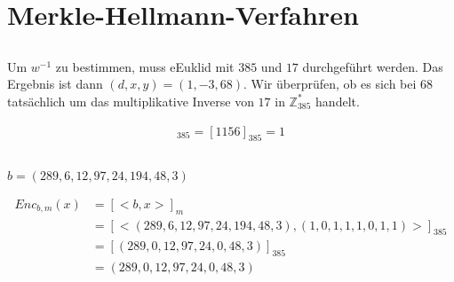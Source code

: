 \documentclass{../crypto}
\begin{document}
\section{Merkle-Hellmann-Verfahren}

%
%
%
%
%

\subsection{}
Um $w^{-1}$ zu bestimmen, muss eEuklid mit $385$ und $17$ durchgeführt werden. Das
Ergebnis ist dann $(d,x,y) = (1,-3,68)$. Wir überprüfen, ob es sich bei $68$
tatsächlich um das multiplikative Inverse von $17$ in $\mathbb{Z}_{385}^*$ handelt.

\begin{align*}
   [17 \cdot 68]_{385} = [1156]_{385} = 1
\end{align*}

\subsection{}

$b = (289, 6, 12, 97, 24, 194, 48, 3)$

\begin{align*}
   Enc_{b,m}(x)  & = [<b,x>]_m                                                            \\
                 & =  [<(289, 6, 12, 97, 24, 194, 48, 3),(1, 0, 1, 1, 1, 0, 1, 1)>]_{385} \\
                 & =  [(289, 0, 12, 97, 24, 0, 48, 3)]_{385}                              \\
                 & =  (289, 0, 12, 97, 24, 0, 48, 3)
\end{align*}

\subsection{}
\end{document}
